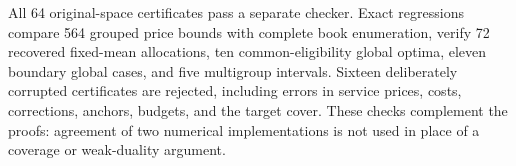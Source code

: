 All 64 original-space certificates pass a separate checker. Exact regressions compare 564 grouped price bounds with complete book enumeration, verify 72 recovered fixed-mean allocations, ten common-eligibility global optima, eleven boundary global cases, and five multigroup intervals. Sixteen deliberately corrupted certificates are rejected, including errors in service prices, costs, corrections, anchors, budgets, and the target cover. These checks complement the proofs: agreement of two numerical implementations is not used in place of a coverage or weak-duality argument.
